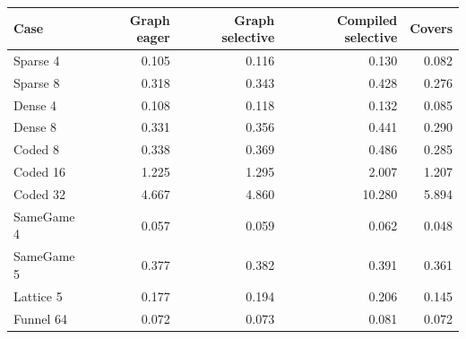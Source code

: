 \begin{center}\small
\begin{tabular}{lrrrr}
\toprule
Case & Graph eager & Graph selective & Compiled selective & Covers \\
\midrule
Sparse 4 & 0.105 & 0.116 & 0.130 & 0.082 \\
Sparse 8 & 0.318 & 0.343 & 0.428 & 0.276 \\
Dense 4 & 0.108 & 0.118 & 0.132 & 0.085 \\
Dense 8 & 0.331 & 0.356 & 0.441 & 0.290 \\
Coded 8 & 0.338 & 0.369 & 0.486 & 0.285 \\
Coded 16 & 1.225 & 1.295 & 2.007 & 1.207 \\
Coded 32 & 4.667 & 4.860 & 10.280 & 5.894 \\
SameGame 4 & 0.057 & 0.059 & 0.062 & 0.048 \\
SameGame 5 & 0.377 & 0.382 & 0.391 & 0.361 \\
Lattice 5 & 0.177 & 0.194 & 0.206 & 0.145 \\
Funnel 64 & 0.072 & 0.073 & 0.081 & 0.072 \\
\bottomrule
\end{tabular}
\end{center}
